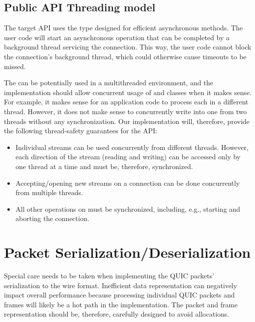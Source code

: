 \subsection{Public API Threading model}

The target API uses the  type designed for efficient asynchronous methods. The user
code will start an asynchronous operation that can be completed by a background thread servicing the
connection. This way, the user code cannot block the connection's background thread, which could
otherwise cause timeouts to be missed.

The \QuicConnection{} can be potentially used in a multithreaded environment, and the implementation
should allow concurrent usage of \QuicConnection{} and \QuicStream{} classes when it makes sense.
For example, it makes sense for an application code to process each \QuicStream{} in a different
thread. However, it does not make sense to concurrently write into one \QuicStream{} from two
threads without any synchronization. Our implementation will, therefore, provide the following
thread-safety guarantees for the API\@:

\begin{itemize}

  \item Individual streams can be used concurrently from different threads. However, each direction
of the stream (reading and writing) can be accessed only by one thread at a time and must be,
therefore, synchronized.

  \item Accepting/opening new streams on a connection can be done concurrently from multiple
threads.

  \item All other operations on \QuicConnection{} must be synchronized, including, e.g., starting
and aborting the connection.

\end{itemize}

\section{Packet Serialization/Deserialization}

Special care needs to be taken when implementing the QUIC packets' serialization to the wire format.
Inefficient data representation can negatively impact overall performance because processing
individual QUIC packets and frames will likely be a hot path in the implementation. The packet and
frame representation should be, therefore, carefully designed to avoid allocations.

